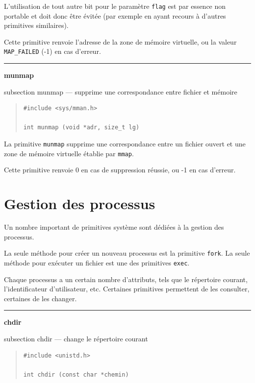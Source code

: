 \documentclass [twoside] {report}
\newcommand {\primitive} [1]
    {
	\phantomsection
	{\large \textbf {#1}}
	\addcontentsline {toc} {subsection} {#1}
    }
\newcommand {\separation}
    {
	\vspace {5mm}
	\nopagebreak
	\hrule
    }
\begin{document}
L'utilisation de tout autre bit pour le paramètre \texttt {flag} est
par essence non portable et doit donc être évitée (par exemple en
ayant recours à d'autres primitives similaires).

Cette primitive renvoie l'adresse de la zone de mémoire virtuelle, ou
la valeur \texttt {MAP\_FAILED} (-1) en cas d'erreur.


\separation
\primitive {munmap} --- supprime une correspondance entre fichier et mémoire

\begin {quote}
\begin {verbatim}
#include <sys/mman.h>

int munmap (void *adr, size_t lg)
\end{verbatim}
\end {quote}

La primitive \texttt {munmap} supprime une correspondance entre un fichier
ouvert et une zone de mémoire virtuelle établie par \texttt {mmap}.

Cette primitive renvoie 0 en cas de suppression réussie, ou -1 en
cas d'erreur.



\section {Gestion des processus}


Un nombre important de primitives système sont
dédiées à la gestion des processus.

La seule méthode pour créer un nouveau processus
est la primitive \texttt {fork}. La seule méthode pour
exécuter un fichier est une des primitives
\texttt {exec}.

Chaque processus a un certain nombre
d'attributs, tels que le répertoire courant,
l'identificateur d'utilisateur, etc. Certaines
primitives permettent de les consulter, certaines
de les changer.


\separation
\primitive {chdir} --- change le répertoire courant

\begin {quote}
\begin {verbatim}
#include <unistd.h>

int chdir (const char *chemin)
\end{verbatim}
\end {quote}
\end{document}
